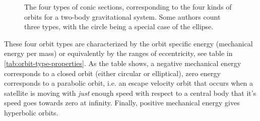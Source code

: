 \begin{figure}[ht]
    \centering
    \hfill
    \caption{The four types of conic sections, corresponding to the four kinds of orbits for a two-body gravitational system. Some authors count three types, with the circle being a special case of the ellipse.}
    \label{fig:conics-and-orbits}
\end{figure}

These four orbit types are characterized by the orbit specific energy (mechanical energy per mass) or equivalently by the ranges of eccentricity, see table in \cref{tab:orbit-type-properties}. As the table shows, a negative mechanical energy corresponds to a closed orbit (either circular or elliptical), zero energy corresponds to a parabolic orbit, i.e. an escape velocity orbit that occurs when a satellite is moving with \emph{just} enough speed with respect to a central body that it's speed goes towards zero at infinity. Finally, positive mechanical energy gives hyperbolic orbits.

